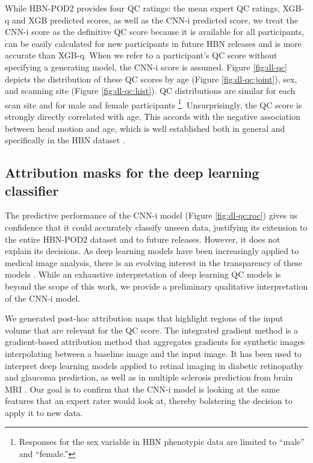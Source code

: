 \documentclass[fleqn,10pt]{wlscirep}
\begin{document}
While HBN-POD2 provides four QC ratings: the mean expert QC ratings, XGB-q and
XGB predicted scores, as well as the CNN-i predicted score, we treat the CNN-i
score as the definitive QC score because it is available for all participants,
can be easily calculated for new participants in future HBN releases and is more
accurate than XGB-q. When we refer to a participant's QC score without
specifying a generating model, the CNN-i score is assumed. Figure
\ref{fig:dl-qc} depicts the distribution of these QC scores by age (Figure
\ref{fig:dl-qc:joint}), sex, and scanning site (Figure \ref{fig:dl-qc:hist}).
QC distributions are similar for each scan site and for male and female
participants \footnote{%
    Responses for the sex variable in HBN phenotypic data are limited to
    ``male'' and ``female.''
}. Unsurprisingly, the QC score is strongly directly correlated with age. This
accords with the negative association between head motion and age, which is well
established both in general \cite{power2012spurious,satterthwaite2012impact,fair2012distinct,yendiki2014spurious} and specifically in the HBN dataset \cite{alexander2017-yc}.

\subsection*{Attribution masks for the deep learning classifier}

The predictive performance of the CNN-i model (Figure \ref{fig:dl-qc:roc}) gives
us confidence that it could accurately classify unseen data, justifying its
extension to the entire HBN-POD2 dataset and to future releases. However, it
does not explain its decisions. As deep learning models have been increasingly
applied to medical image analysis, there is an evolving interest in the
transparency of these models \cite{salahuddin2022transparency}. While an
exhaustive interpretation of deep learning QC models is beyond the scope of this
work, we provide a preliminary qualitative interpretation of the CNN-i model.

We generated post-hoc attribution maps that highlight regions of the input
volume that are relevant for the QC score. The integrated gradient method
\cite{sundararajan2017axiomatic} is a gradient-based attribution method
\cite{ancona2019gradient} that aggregates gradients for synthetic images
interpolating between a baseline image and the input image. It has been used to
interpret deep learning models applied to retinal imaging in diabetic
retinopathy \cite{sayres2019using} and glaucoma \cite{Mehta2021-zp} prediction,
as well as in multiple sclerosis prediction from brain MRI
\cite{wargnier-dauchelle2021interpretable}. Our goal is to confirm that the
CNN-i model is looking at the same features that an expert rater would look at,
thereby bolstering the decision to apply it to new data.
\end{document}
